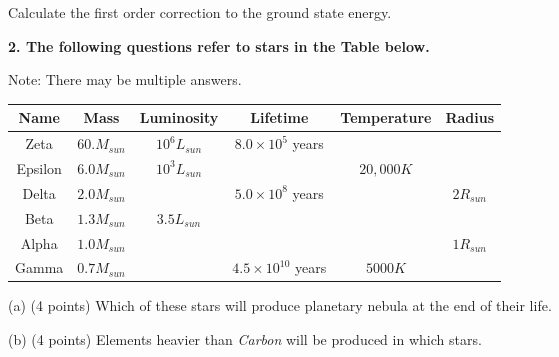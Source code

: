 \documentclass[12pt]{article}
\begin{document}
\begin{description}
\item Calculate the first order correction to the ground state energy.	
\end{description}
\begin{description}
\item \textbf{2. The following questions refer to stars in the Table below.}
\item{Note: There may be multiple answers.}
\end{description}
\begin{tabular}{|c|c|c|c|c|c|}\hline\hline
Name & Mass & Luminosity & Lifetime & Temperature & Radius\\\hline
Zeta & $60. M_{sun}$ & $10^6 L_{sun}$ & $8.0 \times 10^5$ years & & \\\hline
Epsilon & $6.0 M_{sun}$ & $10^3 L_{sun}$ & & $20,000 K $ & \\\hline
Delta & $2.0 M_{sun}$ & & $5.0 \times 10 ^8$ years & & $2 R_{sun}$ \\\hline
Beta & $1.3 M_{sun}$ & $3.5 L_{sun}$ & & & \\\hline
Alpha & $1.0 M_{sun}$ & & & & $1 R_{sun}$ \\\hline
Gamma & $0.7 M_{sun}$ & & $4.5 \times 10^10$ years & $5000 K $ &\\\hline
\end{tabular}
\begin{description}
\item (a) (4 points) Which of these stars will produce planetary nebula at the end of their life.
\vskip0.2in
\item (b) (4 points) Elements heavier than \textit{Carbon} will be produced in which stars. 
\end{description}
\end{document}
